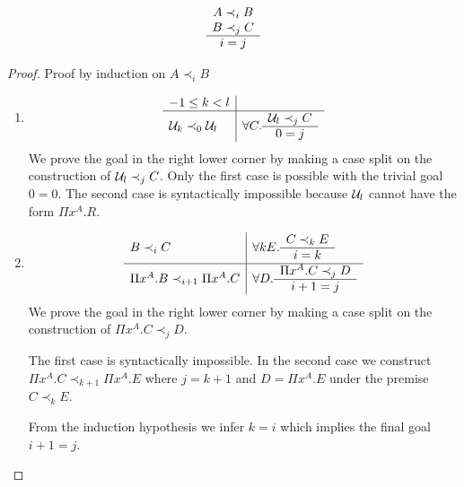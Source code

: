 \begin{lemma}
    $$
    \begin{array}{c} 
        A \prec_i B
        \\
        B \prec_j C
     \\ \hline 
        i = j
    \end{array}
    $$

    \begin{proof}
        Proof by induction on $A \prec_i B$
        \begin{enumerate}
        \item
            $$
            \begin{array}{l|l}
                -1 \le k < l
                \\
                \hline
                {\cal U}_k \prec_0 {\cal U}_l
                &
                \forall C. \begin{array}{c} {\cal U}_l \prec_j C \\ \hline 0 = j\end{array}
            \end{array}
            $$
            We prove the goal in the right lower corner by making a case split
            on the construction of ${\cal U}_l \prec_j C$. Only the first case
            is possible with the trivial goal $0 = 0$. The second case is
            syntactically impossible because ${\cal U}_l$ cannot have the form
            $\Pi x^A. R$.

        \item
        $$
            \begin{array}{l|l}
                B \prec_i C
                &
                \forall k E. \begin{array}{c} C \prec_k E \\ \hline i = k\end{array}
                \\
                \hline
                \Pi x^A.B \prec_{i+1} \Pi x^A. C
                &
                \forall D. \begin{array}{c} \Pi x^A. C \prec_j D \\ \hline i+1 = j\end{array}
            \end{array}
        $$
        We prove the goal in the right lower corner by making a case split on
        the construction of $\Pi x^A.C \prec_j D$.

        The first case is syntactically impossible. In the second case we
        construct $\Pi x^A. C \prec_{k+1} \Pi x^A. E$ where $j = k + 1$ and $D =
        \Pi x^A. E$ under the premise $C \prec_k E$.

        From the induction hypothesis we infer $k = i$ which implies the final
        goal $i + 1 = j$.
        \end{enumerate}
    \end{proof}
\end{lemma}






